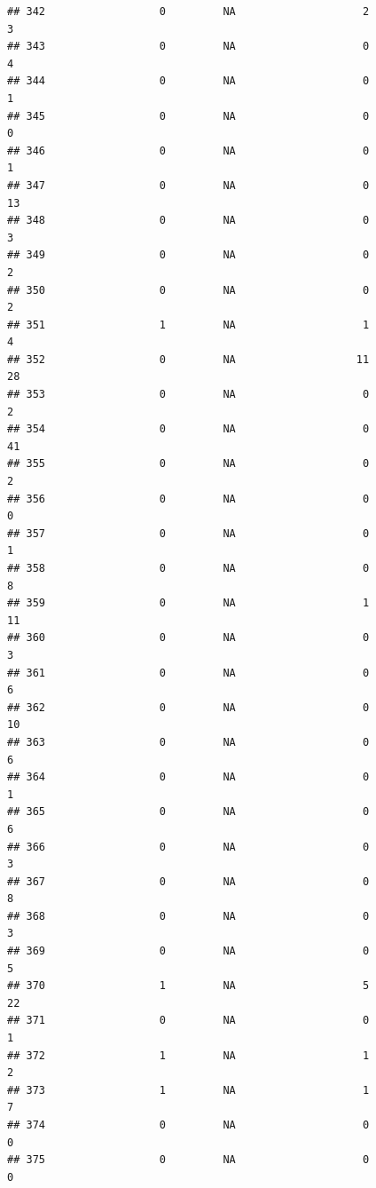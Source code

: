 \documentclass[
]{article}
\begin{document}
\begin{verbatim}
## 342                  0         NA                    2                  3
## 343                  0         NA                    0                  4
## 344                  0         NA                    0                  1
## 345                  0         NA                    0                  0
## 346                  0         NA                    0                  1
## 347                  0         NA                    0                 13
## 348                  0         NA                    0                  3
## 349                  0         NA                    0                  2
## 350                  0         NA                    0                  2
## 351                  1         NA                    1                  4
## 352                  0         NA                   11                 28
## 353                  0         NA                    0                  2
## 354                  0         NA                    0                 41
## 355                  0         NA                    0                  2
## 356                  0         NA                    0                  0
## 357                  0         NA                    0                  1
## 358                  0         NA                    0                  8
## 359                  0         NA                    1                 11
## 360                  0         NA                    0                  3
## 361                  0         NA                    0                  6
## 362                  0         NA                    0                 10
## 363                  0         NA                    0                  6
## 364                  0         NA                    0                  1
## 365                  0         NA                    0                  6
## 366                  0         NA                    0                  3
## 367                  0         NA                    0                  8
## 368                  0         NA                    0                  3
## 369                  0         NA                    0                  5
## 370                  1         NA                    5                 22
## 371                  0         NA                    0                  1
## 372                  1         NA                    1                  2
## 373                  1         NA                    1                  7
## 374                  0         NA                    0                  0
## 375                  0         NA                    0                  0

\end{verbatim}
\end{document}
